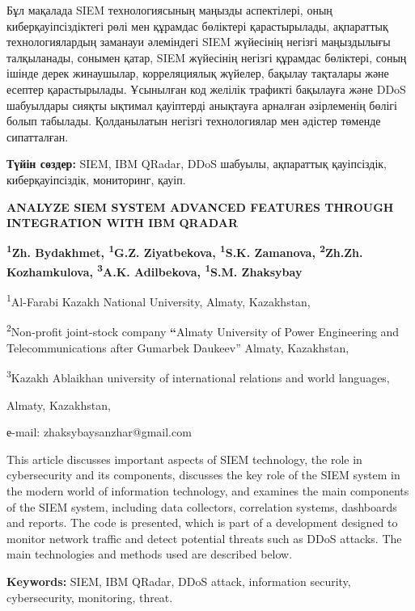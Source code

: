 Бұл мақалада SIEM технологиясының маңызды аспектілері, оның
киберқауіпсіздіктегі рөлі мен құрамдас бөліктері қарастырылады,
ақпараттық технологиялардың заманауи әлеміндегі SIEM жүйесінің негізгі
маңыздылығы талқыланады, сонымен қатар, SIEM жүйесінің негізгі құрамдас
бөліктері, соның ішінде дерек жинаушылар, корреляциялық жүйелер, бақылау
тақталары және есептер қарастырылады. Ұсынылған код желілік трафикті
бақылауға және DDoS шабуылдары сияқты ықтимал қауіптерді анықтауға
арналған әзірлеменің бөлігі болып табылады. Қолданылатын негізгі
технологиялар мен әдістер төменде сипатталған.

{\bfseries Түйін сөздер:} SIEM, IBM QRadar, DDoS шабуылы, ақпараттық
қауіпсіздік, киберқауіпсіздік, мониторинг, қауіп.

\begin{center}
{\large\bfseries ANALYZE SIEM SYSTEM ADVANCED FEATURES THROUGH INTEGRATION WITH
IBM QRADAR}

{\bfseries \textsuperscript{1}Zh. Bydakhmet, \textsuperscript{1}G.Z.
Ziyatbekova\envelope, \textsuperscript{1}S.K. Zamanova, \textsuperscript{2}Zh.Zh.
Kozhamkulova, \textsuperscript{3}A.K. Adilbekova, \textsuperscript{1}S.M.
Zhaksybay}

\textsuperscript{1}Al-Farabi Kazakh National University, Almaty,
Kazakhstan,

\textsuperscript{2}Non-profit joint-stock company {\bfseries ``}Almaty
University of Power Engineering and Telecommunications after Gumarbek
Daukeev'' Almaty, Kazakhstan,

\textsuperscript{3}Kazakh Ablaikhan university of international
relations and world languages,

Almaty, Kazakhstan,

е-mail: zhaksybaysanzhar@gmail.com
\end{center}

This article discusses important aspects of SIEM technology, the role in
cybersecurity and its components, discusses the key role of the SIEM
system in the modern world of information technology, and examines the
main components of the SIEM system, including data collectors,
correlation systems, dashboards and reports. The code is presented,
which is part of a development designed to monitor network traffic and
detect potential threats such as DDoS attacks. The main technologies and
methods used are described below.

{\bfseries Keywords:} SIEM, IBM QRadar, DDoS attack, information security,
cybersecurity, monitoring, threat.

